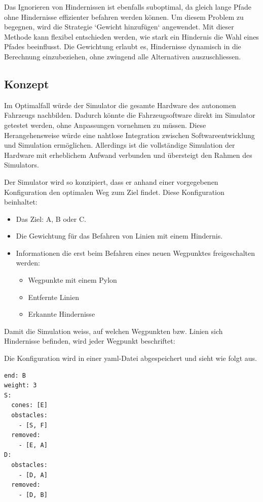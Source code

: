 \documentclass[../main.tex]{subfiles}
\begin{document}
Das Ignorieren von Hindernissen ist ebenfalls suboptimal, da gleich lange Pfade ohne Hindernisse effizienter befahren werden können. Um diesem Problem zu begegnen, wird die Strategie `Gewicht hinzufügen` angewendet. Mit dieser Methode kann flexibel entschieden werden, wie stark ein Hindernis die Wahl eines Pfades beeinflusst. Die Gewichtung erlaubt es, Hindernisse dynamisch in die Berechnung einzubeziehen, ohne zwingend alle Alternativen auszuschliessen.

\subsection{Konzept}

Im Optimalfall würde der Simulator die gesamte Hardware des autonomen Fahrzeugs nachbilden. Dadurch könnte die Fahrzeugsoftware direkt im Simulator getestet werden, ohne Anpassungen vornehmen zu müssen. Diese Herangehensweise würde eine nahtlose Integration zwischen Softwareentwicklung und Simulation ermöglichen. Allerdings ist die vollständige Simulation der Hardware mit erheblichem Aufwand verbunden und übersteigt den Rahmen des Simulators.

Der Simulator wird so konzipiert, dass er anhand einer vorgegebenen Konfiguration den optimalen Weg zum Ziel findet. Diese Konfiguration beinhaltet:
\begin{itemize}
    \item Das Ziel: A, B oder C.
    \item Die Gewichtung für das Befahren von Linien mit einem Hindernis.
    \item Informationen die erst beim Befahren eines neuen Wegpunktes freigeschalten werden:
     \begin{itemize}
        \item Wegpunkte mit einem Pylon 
        \item Entfernte Linien
        \item Erkannte Hindernisse
   \end{itemize}
\end{itemize}


Damit die Simulation weiss, auf welchen Wegpunkten bzw. Linien sich Hindernisse befinden, wird jeder Wegpunkt beschriftet:


Die Konfiguration wird in einer \acrshort{yaml}-Datei abgespeichert und sieht wie folgt aus.

\begin{verbatim}
end: B
weight: 3
S:
  cones: [E]
  obstacles: 
    - [S, F] 
  removed:
    - [E, A]
D:
  obstacles:
    - [D, A]
  removed:
    - [D, B]
\end{verbatim}
\end{document}
